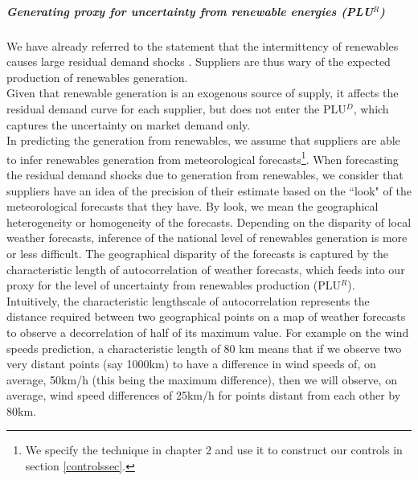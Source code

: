 \subparagraph{Generating proxy for uncertainty from renewable energies (PLU$^R$)}
\label{proxyautocorrel}

We have already referred to the statement that the intermittency of renewables causes large residual demand shocks \cite{epexwebsite1}. Suppliers are thus wary of the expected production of renewables generation. \\

Given that renewable generation is an exogenous source of supply, it affects the residual demand curve for each supplier, but does not enter the PLU$^D$, which captures the uncertainty on market demand only. \\

In predicting the generation from renewables, we assume that suppliers are able to infer renewables generation from meteorological forecasts\footnote{We specify the technique in chapter 2 and use it to construct our controls in section \ref{controlssec}.}.
When forecasting the residual demand shocks due to generation from renewables, we consider that suppliers have an idea of the precision of their estimate based on the ``look" of the meteorological forecasts that they have. By look, we mean the geographical heterogeneity or homogeneity of the forecasts. Depending on the disparity of local weather forecasts, inference of the national level of renewables generation is more or less difficult. The geographical disparity of the forecasts is captured by the characteristic length of autocorrelation of weather forecasts, which feeds into our proxy for the level of uncertainty from renewables production (PLU$^R$).\\ 

Intuitively, the characteristic lengthscale of autocorrelation represents the distance required between two geographical points on a map of weather forecasts to observe a decorrelation of half of its maximum value.
For example on the wind speeds prediction, a characteristic length of 80 km means that 
if we observe two very distant points (say 1000km) to have a difference in wind speeds of, on average, 50km/h (this being the maximum difference), then we will observe, on average, wind speed differences of 25km/h for points distant from each other by 80km. \\



